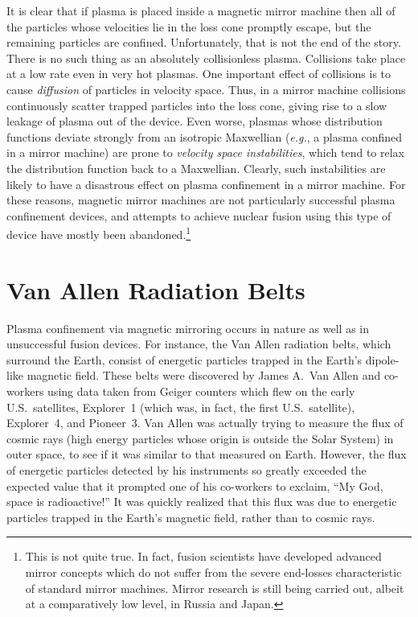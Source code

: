 It is clear that if  plasma is placed inside  a magnetic mirror machine then all
of the particles whose velocities lie in the loss cone  promptly escape, but the
remaining particles are confined. Unfortunately, that is not
the end of the story. There is no such thing as an absolutely collisionless
plasma. Collisions take place at a low rate even in very hot plasmas. 
One important 
effect of collisions is to cause {\em diffusion}\/ of particles in velocity space.
Thus, in a mirror machine collisions continuously scatter trapped particles into
the loss cone, giving rise to a slow leakage of plasma out of the device. 
Even worse, plasmas whose distribution functions deviate strongly from an isotropic
Maxwellian ({\em e.g.}, a plasma confined
in a mirror machine) are prone to {\em velocity space instabilities}, which tend to
relax the distribution function back to a Maxwellian. Clearly, such instabilities
are likely to have a disastrous effect on plasma confinement in a mirror machine. 
For these reasons, magnetic mirror machines are not particularly successful
plasma confinement devices, and attempts to achieve nuclear fusion using
this type of  device have mostly been abandoned.\footnote{This is not quite
true. In fact, fusion scientists have developed advanced mirror concepts
which do not suffer from the severe end-losses characteristic of
standard mirror machines. Mirror research is still being carried out, 
albeit at a
comparatively low level, in Russia and Japan.}

\section{Van Allen Radiation Belts}
Plasma confinement via magnetic mirroring occurs in nature as
well as in unsuccessful fusion devices. For instance, the Van Allen radiation belts,
which surround the Earth, consist of energetic particles trapped 
in the Earth's dipole-like magnetic field. These belts were discovered by 
James A.~Van Allen and co-workers using data taken from Geiger counters
which flew on the early U.S.\ satellites, Explorer~1 (which was, in fact, the
first U.S.\ satellite), Explorer~4, and Pioneer~3. Van Allen was actually
trying to measure the flux of cosmic rays (high energy particles whose origin is
outside the Solar System) in outer space, to see if it
was similar to that measured on Earth. However, the flux of energetic particles
detected by his instruments so greatly exceeded the expected value that it
prompted one of his co-workers to exclaim, ``My God, space is radioactive!''
It was quickly realized that this flux was due to energetic
particles trapped in the Earth's magnetic field, rather than to cosmic rays. 

